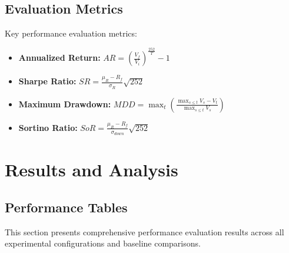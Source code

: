 \documentclass[10pt,twocolumn]{article}
\begin{document}
\subsection{Evaluation Metrics}

Key performance evaluation metrics:

\begin{itemize}[itemsep=2pt, leftmargin=15pt]
\item \textbf{Annualized Return:} $AR = \left(\frac{V_f}{V_i}\right)^{\frac{252}{T}} - 1$
\item \textbf{Sharpe Ratio:} $SR = \frac{\mu_R - R_f}{\sigma_R} \sqrt{252}$
\item \textbf{Maximum Drawdown:} $MDD = \max_{t} \left(\frac{\max_{s \leq t} V_s - V_t}{\max_{s \leq t} V_s}\right)$
\item \textbf{Sortino Ratio:} $SoR = \frac{\mu_R - R_f}{\sigma_{down}} \sqrt{252}$
\end{itemize}

\section{Results and Analysis}

\subsection{Performance Tables}

This section presents comprehensive performance evaluation results across all experimental configurations and baseline comparisons.
\end{document}
